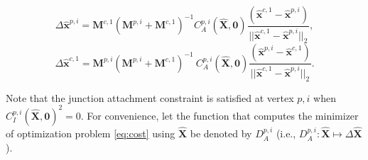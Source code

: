 \begin{thm}
\begin{equation*}
    \label{eq:momentum_solution1_attach} 
  \Delta \hat{\mathbf{x}}^{p, i} =  \mathbf{M}^{c, 1} (\mathbf{M}^{p, i}+\mathbf{M}^{c, 1})^{-1}  C^{p,i}_A(\hat{\mathbf{X}},\mathbf{0}) \frac{(\hat{\mathbf{x}}^{c, 1} - \hat{\mathbf{x}}^{p, i})}{||\hat{\mathbf{x}}^{c, 1} - \hat{\mathbf{x}}^{p, i}||_2},
\end{equation*}
\begin{equation*}
    \label{eq:momentum_solution2_attach} 
     \Delta \hat{\mathbf{x}}^{c, 1} =  \mathbf{M}^{p, i}  (\mathbf{M}^{p, i}+\mathbf{M}^{c, 1})^{-1}
    \ C^{p,i}_A(\hat{\mathbf{X}},\mathbf{0}) \frac{(\hat{\mathbf{x}}^{p, i} - \hat{\mathbf{x}}^{c, 1})}{||\hat{\mathbf{x}}^{c, 1} - \hat{\mathbf{x}}^{p, i}||_2}.
\end{equation*}
\end{thm}
\noindent  Note that the junction attachment constraint is satisfied at vertex $p,i$ when $C^{p,i}_{I}(\hat{\mathbf{X}}, \mathbf{0})^2 = 0$.
For convenience, let the function that computes the minimizer of optimization problem \eqref{eq:cost} using $\hat{\mathbf{X}}$ be denoted by $D^{p,i}_A$ (i.e., $D^{p,i}_A: \hat{\mathbf{X}} \mapsto \Delta \hat{\mathbf{X}}$). 


